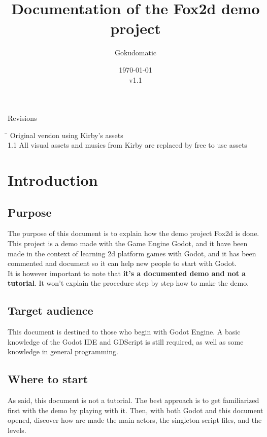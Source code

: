 \documentclass[10pt,a4paper]{article}
\author{Gokudomatic}
\title{Documentation of the Fox2d demo project}
\date{\today\\v1.1}
\begin{document}
\maketitle

\clearpage

\begin{center}
{\Large Revisions}
\begin{tabbing}
\hspace{1cm} \=  \> Original version using Kirby's assets\\
1.1 \> All visual assets and musics from Kirby are replaced by free to use assets
\end{tabbing}
\end{center}

\clearpage

\tableofcontents

\clearpage

\section{Introduction}

\subsection{Purpose}
The purpose of this document is to explain how the demo project Fox2d is done. This project is a demo made with the Game Engine Godot\cite{godot}, and it have been made in the context of learning 2d platform games with Godot, and it has been commented and document so it can help new people to start with Godot. \\
It is however important to note that \textbf{it's a documented demo and not a tutorial}. It won't explain the procedure step by step how to make the demo.

\subsection{Target audience}
This document is destined to those who begin with Godot Engine. A basic knowledge of the Godot IDE and GDScript is still required, as well as some knowledge in general programming.

\subsection{Where to start}
As said, this document is not a tutorial. The best approach is to get familiarized first with the demo by playing with it. Then, with both Godot and this document opened, discover how are made the main actors, the singleton script files, and the levels.
\end{document}
